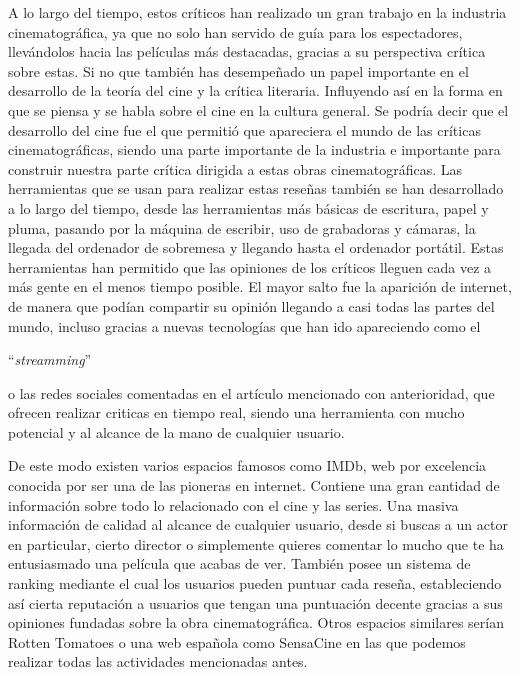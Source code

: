 A lo largo del tiempo, estos críticos han realizado un gran trabajo en la industria cinematográfica, ya que no solo han servido de guía para los espectadores, llevándolos hacia las películas más destacadas, gracias a su perspectiva crítica sobre estas. Si no que también has desempeñado un papel importante en el desarrollo de la teoría del cine y la crítica literaria. Influyendo así en la forma en que se piensa y se habla sobre el cine en la cultura general. Se podría decir que el desarrollo del cine fue el que permitió que apareciera el mundo de las críticas cinematográficas, siendo una parte importante de la industria e importante para construir nuestra parte crítica dirigida a estas obras cinematográficas. Las  herramientas que se usan para realizar estas reseñas también se han desarrollado a lo largo del tiempo, desde las herramientas más básicas de escritura, papel y pluma, pasando por la máquina de escribir, uso de grabadoras y cámaras, la llegada del ordenador de sobremesa y llegando hasta el ordenador portátil. Estas herramientas han permitido que las opiniones de los críticos lleguen cada vez a más gente en el menos tiempo posible. El mayor salto fue la aparición de internet, de manera que podían compartir su opinión llegando a casi todas las partes del mundo, incluso gracias a nuevas tecnologías que han ido apareciendo como el \begin{otherlanguage}{english}``\textit{streamming}''\end{otherlanguage} o las redes sociales comentadas en el artículo mencionado con anterioridad, que ofrecen realizar criticas en tiempo real, siendo una herramienta con mucho potencial y al alcance de la mano de cualquier usuario.

De este modo existen varios espacios famosos como IMDb\cite{IMDbWeb}, web por excelencia conocida por ser una de las pioneras en internet. Contiene una gran cantidad de información sobre todo lo relacionado con el cine y las series. Una masiva información de calidad al alcance de cualquier usuario, desde si buscas a un actor en particular, cierto director o simplemente quieres comentar lo mucho que te ha entusiasmado una película que acabas de ver. También posee un sistema de ranking mediante el cual los usuarios pueden puntuar cada reseña, estableciendo así cierta reputación a usuarios que tengan una puntuación decente gracias a sus opiniones fundadas sobre la obra cinematográfica. Otros espacios similares serían Rotten Tomatoes\cite{RottenTWeb} o una web española como SensaCine\cite{SSweb} en las que podemos realizar todas las actividades mencionadas antes.

